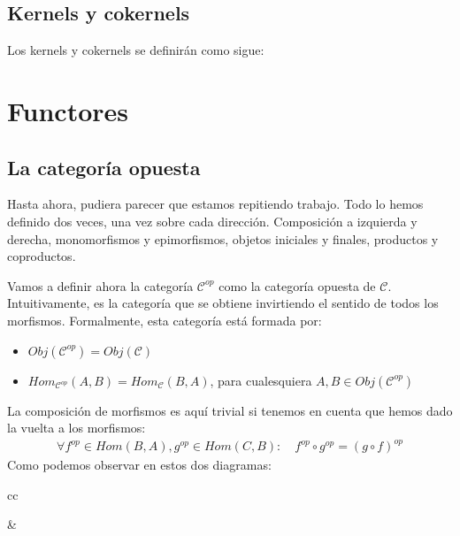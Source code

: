 \documentclass[11pt, fleqn, spanish]{book}
\newcommand{\C}{\mathcal{C} }
\begin{document}
  \section{Kernels y cokernels}
    Los kernels y cokernels se definirán como sigue:
    \begin{center}
    \end{center}
    \begin{center}
    \end{center}

    
\chapter {Functores}
  \section{La categoría opuesta}
  Hasta ahora, pudiera parecer que estamos repitiendo trabajo. Todo lo hemos definido dos veces,
  una vez sobre cada dirección. Composición a izquierda y derecha, monomorfismos y epimorfismos,
  objetos iniciales y finales, productos y coproductos. 
  
  Vamos a definir ahora la categoría $\C^{op}$ como la categoría opuesta de $\C$. Intuitivamente,
  es la categoría que se obtiene invirtiendo el sentido de todos los morfismos. Formalmente,
  esta categoría está formada por:
  \begin{itemize}
   \item $Obj(\C^{op}) = Obj(\C)$
   \item $Hom_{\C^{op}}(A,B) = Hom_{\C}(B,A)$, para cualesquiera $A,B \in Obj(\C^{op})$
  \end{itemize}
  La composición de morfismos es aquí trivial si tenemos en cuenta que hemos dado la vuelta
  a los morfismos:
  \begin{gather*}
   \forall f^{op} \in Hom(B,A), g^{op} \in Hom(C,B):\quad f^{op} \circ g^{op} = (g \circ f)^{op}
  \end{gather*}
  Como podemos observar en estos dos diagramas:
  \begin{center}
    \begin{tabular}{cc}
      &
    \end{tabular}
  \end{center}
\end{document}
